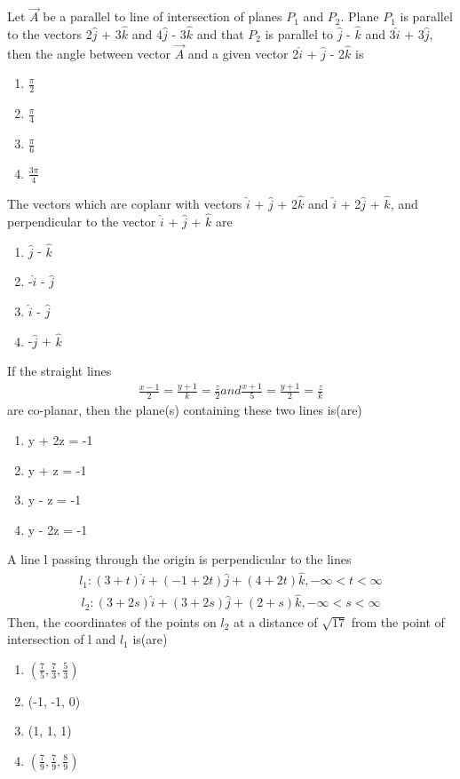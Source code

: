 \item Let $\overrightarrow{A}$ be a parallel to line of intersection of planes $P_1$ and $P_2$. Plane $P_1$ is parallel to the vectors 2$\hat{j}$ + 3$\hat{k}$ and 4$\hat{j}$ - 3$\hat{k}$ and that $P_2$ is parallel to 
$\hat{j}$ - $\hat{k}$ and 3$\hat{i}$ + 3$\hat{j}$, then the angle between vector $\overrightarrow{A}$ and a given vector 2$\hat{i}$ + $\hat{j}$ - 2$\hat{k}$ is
\begin{enumerate}
\item $\frac{\pi}{2}$
\item $\frac{\pi}{4}$
\item $\frac{\pi}{6}$
\item $\frac{3\pi}{4}$
\end{enumerate}

\item The vectors which are coplanr with vectors $\hat{i}$ + $\hat{j}$ + 2$\hat{k}$ and $\hat{i}$ + 2$\hat{j}$ + $\hat{k}$, and perpendicular to the vector $\hat{i}$ + $\hat{j}$ + $\hat{k}$ are
\begin{enumerate}
\item $\hat{j}$ - $\hat{k}$
\item -$\hat{i}$ - $\hat{j}$
\item $\hat{i}$ - $\hat{j}$
\item -$\hat{j}$ + $\hat{k}$
\end{enumerate}

\item If the straight lines 
\begin{align*}
\frac{x-1}{2} = \frac{y+1}{k} = \frac{z}{2} and \frac{x+1}{5} = \frac{y+1}{2} = \frac{z}{k}
\end{align*}
are co-planar, then the plane(s) containing these two lines is(are)
\begin{enumerate}
\item y + 2z = -1
\item y + z = -1
\item y - z = -1
\item y - 2z = -1
\end{enumerate}

\item A line l passing through the origin is perpendicular to the lines
\begin{align*}
l_1: (3 + t)\hat{i} + (-1 + 2t)\hat{j} + (4 + 2t)\hat{k}, -\infty < t < \infty
\end{align*}
\begin{align*}
l_2: (3 + 2s)\hat{i} + (3 + 2s)\hat{j} + (2 + s)\hat{k}, -\infty < s < \infty
\end{align*}
Then, the coordinates of the points on $l_2$ at a distance of $\sqrt{17}$ from the point of intersection of l and $l_1$ is(are)
\begin{enumerate}
\item $(\frac{7}{5}, \frac{7}{3}, \frac{5}{3})$
\item (-1, -1, 0)
\item (1, 1, 1)
\item $(\frac{7}{9}, \frac{7}{9}, \frac{8}{9})$
\end{enumerate}

